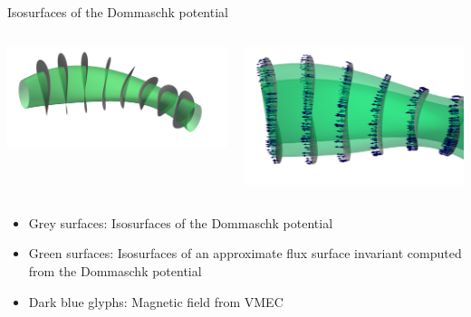 \documentclass[
	english,%
	logo=false,%
	eurofusion=false, %
	titlegraphic=true, %
	]{ippbeamer}
\begin{document}
\begin{frame}{Isosurfaces of the Dommaschk potential}
	\begin{columns}[
		onlytextwidth,%
		c, %
		]
	\begin{column}{.5\linewidth}
			\includegraphics[width=\textwidth]{plots/compare_gvec_dommaschk.png}
	\end{column}
	\begin{column}{.5\linewidth}
			\includegraphics[width=\textwidth]{plots/surfaces_with_magnetic_field_sideview.png}
	\end{column}
	\end{columns}

	\begin{itemize}
		\item Grey surfaces: Isosurfaces of the Dommaschk potential
		\item Green surfaces: Isosurfaces of an approximate flux 
			surface invariant computed from the Dommaschk potential
		\item Dark blue glyphs: Magnetic field from VMEC
	\end{itemize}
\end{frame}
\end{document}
